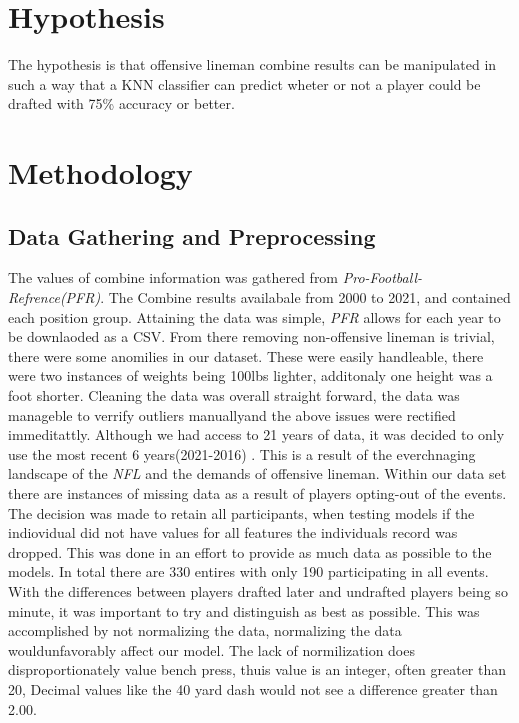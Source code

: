 \documentclass[confrence]{IEEEtran}
\begin{document}
\section*{Hypothesis}
The hypothesis is that offensive lineman combine results can be manipulated in such a way that a KNN classifier can predict wheter or not a player could be drafted with 75\% accuracy or better.
\section*{Methodology}
\subsection*{Data Gathering and Preprocessing}
The values of combine information was gathered from \textit{Pro-Football-Refrence(PFR)}.
The Combine results availabale from 2000 to 2021, and contained each position group.
Attaining the data was simple, \textit{PFR} allows for each year to be downlaoded as a CSV.
From there removing non-offensive lineman is trivial, there were some anomilies in our dataset.
These were easily handleable, there were two instances of weights being 100lbs lighter, additonaly one height was a foot shorter.
Cleaning the data was overall straight forward, the data was manageble to verrify outliers manuallyand the above issues were rectified immeditattly.
Although we had access to 21 years of data, it was decided to only use the most recent 6 years(2021-2016) . This is a result of the everchnaging landscape of the \textit{NFL} and the demands of offensive lineman. 
Within our data set there are instances of missing data as a result of players opting-out of the events. 
The decision was made to retain all participants, when testing models if the indiovidual did not have values for all features the individuals record was dropped.
This was done in an effort to provide as much data as possible to the models. In total there are 330 entires with only 190 participating in all events.
With the differences between players drafted later and undrafted players being so minute, it was important to try and distinguish as best as possible. 
This was accomplished by not normalizing the data, normalizing the data wouldunfavorably affect our model.
The lack of normilization does disproportionately value bench press, thuis value is an integer, often greater than 20, Decimal values like the 40 yard dash would not see a difference greater than 2.00.
\end{document}
